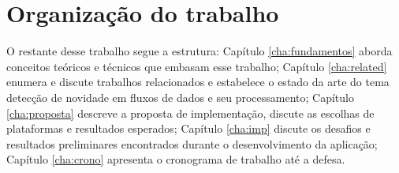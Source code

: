 \section{Organização do trabalho}








O restante desse trabalho segue a estrutura:
Capítulo \ref{cha:fundamentos} aborda conceitos teóricos e técnicos que embasam
esse trabalho;
Capítulo \ref{cha:related} enumera e discute trabalhos relacionados e estabelece
o estado da arte do tema detecção de novidade em fluxos de dados e seu processamento;
Capítulo \ref{cha:proposta} descreve a proposta de implementação, discute
as escolhas de plataformas e resultados esperados;
Capítulo \ref{cha:imp} discute os desafios e resultados preliminares encontrados
durante o desenvolvimento da aplicação;
Capítulo \ref{cha:crono} apresenta o cronograma de trabalho até a defesa.

